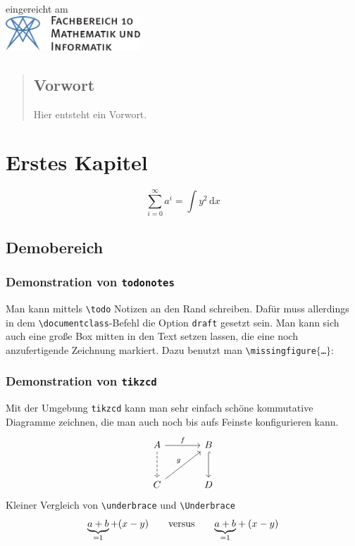\begin{titlepage}
  \vfill

	{\large eingereicht am \thedate}\\[3cm] %


	\includegraphics[height=1.3cm,keepaspectratio]{Bilder/fb10logo.pdf}\\[1cm] %
 

	
\end{titlepage}
\begin{abstract}
\section*{Vorwort}
Hier entsteht ein Vorwort.
\end{abstract}
\tableofcontents
\cleardoubleoddemptypage
{}
\setcounter{page}{1}

\chapter{Erstes Kapitel} %
\label{cha:erstes_kapitel}
\[
	\sum_{i=0}^{\infty} a^i = \int y^2 \,\mathrm{d} x 
\]

\section{Demobereich} %
\subsection{Demonstration von \texttt{todonotes}} 
Man kann mittels \texttt{\textbackslash{}todo} Notizen an den Rand schreiben. Dafür muss allerdings in dem \texttt{\textbackslash{}documentclass}-Befehl die Option \texttt{draft} gesetzt sein. Man kann sich auch eine große Box mitten in den Text setzen lassen, die eine noch anzufertigende Zeichnung markiert. Dazu benutzt man \texttt{\textbackslash{}missingfigure$\{$\ldots$\}$}:

\subsection{Demonstration von \texttt{tikzcd}}
Mit der Umgebung \texttt{tikzcd} kann man sehr einfach schöne kommutative Diagramme zeichnen, die man auch noch bis aufs Feinste konfigurieren kann.
\[
	\begin{tikzcd}[sep=large]
		A \rar["f"] \dar[dashed] & B \dar[hook] \\
		C \urar["g"] & D
	\end{tikzcd}
\]
Kleiner Vergleich von \texttt{\textbackslash{}underbrace} und \texttt{\textbackslash{}Underbrace}
\[
	\underbrace{a+b}_{=1} + (x-y) \qquad \text{versus} \qquad {\underbrace{a+b}_{=1}} + (x-y)
\]

